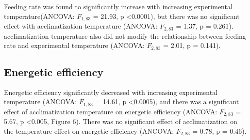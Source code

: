 \documentclass[../../Paper.tex]{subfiles}
\begin{document}
Feeding rate was found to significantly increase with increasing
experimental temperature(ANCOVA: $F_{1,83}$ = 21.93, p \textless  0.0001), but
there was no significant effect with acclimatization temperature 
(ANCOVA: $F_{2,83}$ = 1.37, p = 0.261). acclimatization temperature also did not modify
the relationship between feeding rate and 
experimental temperature (ANCOVA: $F_{2,83}$ = 2.01, p = 0.141). 



\vspace{2.5cm}



\subsection*{Energetic efficiency}

Energetic efficiency significantly decreased with increasing experimental 
temperature (ANCOVA: $F_{1,83}$ = 14.61, p \textless  0.0005), and there was a 
significant effect of acclimatization temperature on energetic efficiency 
(ANCOVA: $F_{2,83}$ = 5.67, p \textless  0.005, Figure 6). There was no significant effect of
acclimatization on the temperature effect on energetic efficiency (ANCOVA: $F_{2,83}$ = 0.78, 
p = 0.46). 

\vspace{2.5cm}
\end{document}
